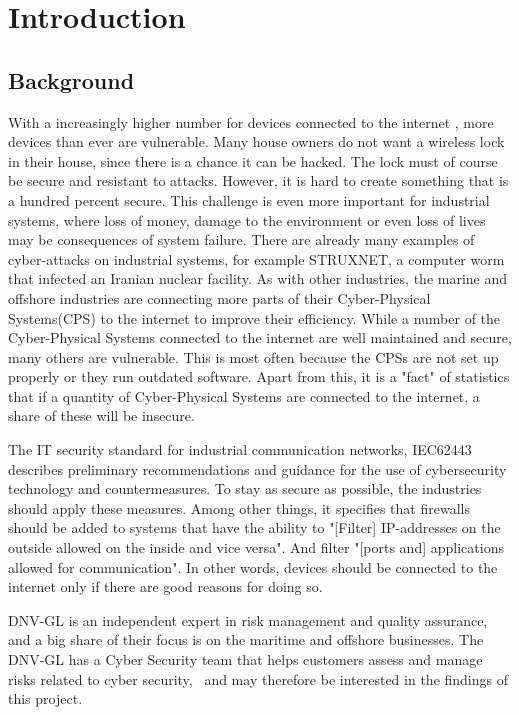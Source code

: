 \section{Introduction} \label{sec:intro}

\subsection{Background} \label{sec:background}
With a increasingly higher number for devices connected to the internet \cite{iot_stats}, more devices than ever are vulnerable. Many house owners do not want a wireless lock in their house, since there is a chance it can be hacked. The lock must of course be secure and resistant to attacks. However, it is hard to create something that is a hundred percent secure. This challenge is even more important for industrial systems, where loss of money, damage to the environment or even loss of lives may be consequences of system failure. There are already many examples of cyber-attacks on industrial systems, for example STRUXNET\cite{struxnet}, a computer worm that infected an Iranian nuclear facility. 
As with other industries, the marine and offshore industries are connecting more parts of their Cyber-Physical Systems(CPS) to the internet to improve their efficiency. While a number of the Cyber-Physical Systems connected to the internet are well maintained and secure, many others are vulnerable. This is most often because the CPSs are not set up properly or they run outdated software. Apart from this, it is a "fact" of statistics that if a quantity of Cyber-Physical Systems are connected to the internet, a share of these will be insecure. 

The IT security standard for industrial communication networks, IEC62443 describes preliminary recommendations and guidance for the use of cybersecurity technology and countermeasures. To stay as secure as possible, the industries should apply these measures.\cite{IEC62443} Among other things, it specifies that firewalls should be added to systems that have the ability to "[Filter] IP-addresses on the outside allowed on the inside and vice versa". And filter "[ports and] applications allowed for communication". In other words, devices should be connected to the internet only if there are good reasons for doing so.

DNV-GL is an independent expert in risk management and quality assurance, and a big share of their focus is on the maritime and offshore businesses. The DNV-GL has a Cyber Security team that helps customers assess and manage risks related to cyber security,~\cite{DNVGL_cybersec} and may therefore be interested in the findings of this project.

